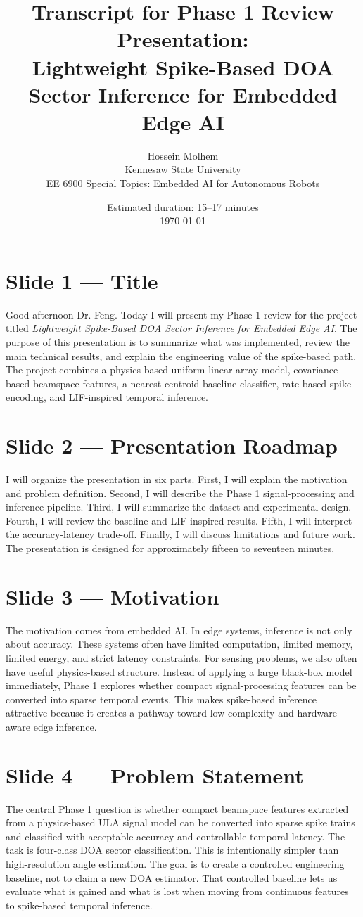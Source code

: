\documentclass[11pt]{article}
\title{Transcript for Phase 1 Review Presentation:\\Lightweight Spike-Based DOA Sector Inference for Embedded Edge AI}
\author{Hossein Molhem\\Kennesaw State University\\EE 6900 Special Topics: Embedded AI for Autonomous Robots}
\date{Estimated duration: 15--17 minutes\\\today}
\begin{document}
\maketitle

\section*{Slide 1 — Title}
Good afternoon Dr. Feng. Today I will present my Phase 1 review for the project titled \emph{Lightweight Spike-Based DOA Sector Inference for Embedded Edge AI}. The purpose of this presentation is to summarize what was implemented, review the main technical results, and explain the engineering value of the spike-based path. The project combines a physics-based uniform linear array model, covariance-based beamspace features, a nearest-centroid baseline classifier, rate-based spike encoding, and LIF-inspired temporal inference.

\section*{Slide 2 — Presentation Roadmap}
I will organize the presentation in six parts. First, I will explain the motivation and problem definition. Second, I will describe the Phase 1 signal-processing and inference pipeline. Third, I will summarize the dataset and experimental design. Fourth, I will review the baseline and LIF-inspired results. Fifth, I will interpret the accuracy-latency trade-off. Finally, I will discuss limitations and future work. The presentation is designed for approximately fifteen to seventeen minutes.

\section*{Slide 3 — Motivation}
The motivation comes from embedded AI. In edge systems, inference is not only about accuracy. These systems often have limited computation, limited memory, limited energy, and strict latency constraints. For sensing problems, we also often have useful physics-based structure. Instead of applying a large black-box model immediately, Phase 1 explores whether compact signal-processing features can be converted into sparse temporal events. This makes spike-based inference attractive because it creates a pathway toward low-complexity and hardware-aware edge inference.

\section*{Slide 4 — Problem Statement}
The central Phase 1 question is whether compact beamspace features extracted from a physics-based ULA signal model can be converted into sparse spike trains and classified with acceptable accuracy and controllable temporal latency. The task is four-class DOA sector classification. This is intentionally simpler than high-resolution angle estimation. The goal is to create a controlled engineering baseline, not to claim a new DOA estimator. That controlled baseline lets us evaluate what is gained and what is lost when moving from continuous features to spike-based temporal inference.
\end{document}
